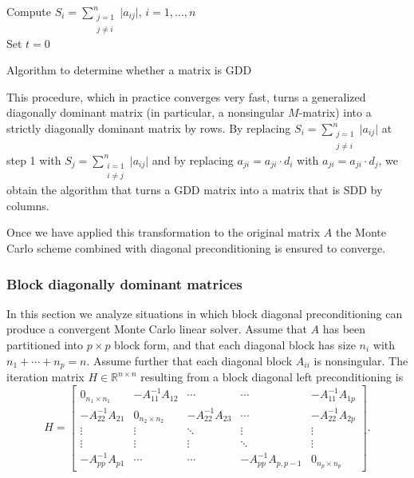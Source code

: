 \documentclass[final,leqno,onefignum,onetabnum]{siamltex1213}
\begin{document}
\begin{algorithm}[H]
\LinesNumbered

 Compute $\displaystyle S_{i}=\sum_{\substack{j=1 \\ j\ne i}}^n\lvert
a_{ij}\rvert$,
$i=1,\ldots,n$\\
Set $t=0$\\
 \caption{Algorithm to determine whether a matrix is GDD}
\end{algorithm}

This procedure, which in practice converges very fast, turns a generalized
diagonally dominant matrix (in particular, a nonsingular $M$-matrix) into a
strictly diagonally dominant matrix by rows. By replacing
$\displaystyle S_{i}=\sum^{n}_{\substack{j=1 \\ j\ne i}}\lvert a_{ij}\rvert$
at step 1 with
$\displaystyle S_{j}=\sum^{n}_{\substack{i=1 \\ i\ne j}}\lvert a_{ij}\rvert$
and by replacing
$a_{ji}=a_{ji}\cdot d_i$ with $a_{ji}=a_{ji}\cdot d_j$, we obtain the algorithm
that turns a GDD matrix into a matrix that is SDD by columns.

Once we have applied this transformation to the original matrix $A$
the Monte Carlo scheme combined with diagonal preconditioning
is ensured to converge.

\subsubsection{Block diagonally dominant matrices}
\label{sec:bdd}

In this section we analyze situations in which block diagonal preconditioning
can produce a convergent Monte Carlo linear solver.
Assume that $A$ has been partitioned into $p\times p$ block form, and that
each diagonal block has size $n_i$ with $n_1 +\cdots +n_p=n$. Assume further
that each diagonal block $A_{ii}$ is nonsingular.
The iteration
matrix $H\in\mathbb{R}^{n\times n}$ resulting from a block diagonal left
preconditioning is
\[
 H=\begin{bmatrix}0_{n_1\times n_1} & -A_{11}^{-1}A_{12} & \cdots &
\cdots & -A_{11}^{-1}A_{1p} \\
-A_{22}^{-1}A_{21} & 0_{n_2\times n_2} & -A_{22}^{-1}A_{23} &
\cdots & -A_{22}^{-1}A_{2p}\\
\vdots & \vdots & \ddots & \vdots & \vdots\\
\vdots & \vdots & \vdots &\ddots & \vdots \\
-A_{pp}^{-1}A_{p1} &  \cdots & \cdots&
-A_{pp}^{-1}A_{p,p-1} & 0_{n_p \times n_p}
\end{bmatrix}.
\]
\end{document}
